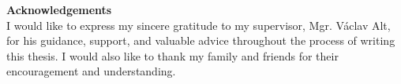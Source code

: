 \newpage
\pagestyle{empty}

\noindent
{\large\bfseries Acknowledgements}\\

\noindent
I would like to express my sincere gratitude to my supervisor, Mgr. Václav Alt, for his guidance, support, and valuable advice throughout the process of writing this thesis.
I would also like to thank my family and friends for their encouragement and understanding.

